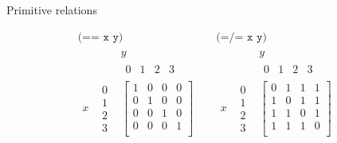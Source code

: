 \documentclass{beamer}
\begin{document}
\begin{frame}{Primitive relations}

	\begin{align*}
		\texttt{(== x y)} && \texttt{(=/= x y)} \\
		\begin{matrix}
			& & y \\
			& & \begin{matrix} 0 & 1 & 2 & 3 \end{matrix} \\
			x & \begin{matrix} 0 \\ 1 \\ 2 \\ 3 \end{matrix} &
			\begin{bmatrix}
				1 & 0 & 0 & 0 \\
				0 & 1 & 0 & 0 \\
				0 & 0 & 1 & 0 \\
				0 & 0 & 0 & 1 \\
			\end{bmatrix}
		\end{matrix}
		&&
		\begin{matrix}
			& & y \\
			& & \begin{matrix} 0 & 1 & 2 & 3 \end{matrix} \\
			x & \begin{matrix} 0 \\ 1 \\ 2 \\ 3 \end{matrix} &
			\begin{bmatrix}
				0 & 1 & 1 & 1 \\
				1 & 0 & 1 & 1 \\
				1 & 1 & 0 & 1 \\
				1 & 1 & 1 & 0 \\
			\end{bmatrix}
		\end{matrix}
	\end{align*}

\end{frame}
\end{document}
